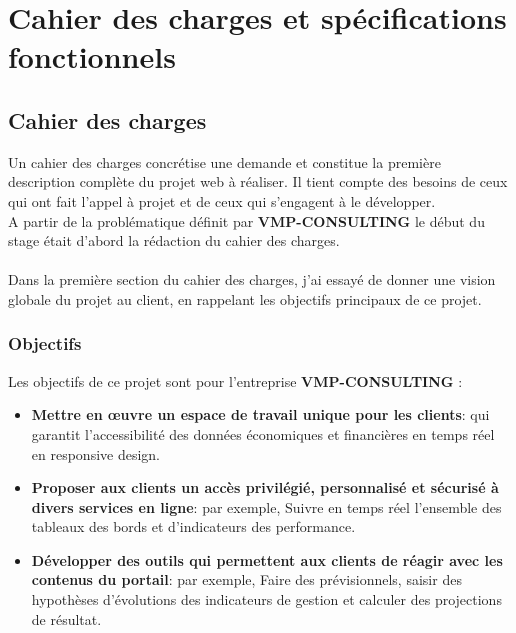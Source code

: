\documentclass[12pt]{article}
\begin{document}
\newpage

\section{ Cahier des charges et spécifications fonctionnels}

\subsection{ Cahier des charges}
Un cahier des charges concrétise une demande et constitue la première description complète du projet web à réaliser. Il tient compte des besoins de ceux qui ont fait l’appel à projet et de ceux qui s’engagent à le développer.\\


A partir de la problématique définit par \textbf{VMP-CONSULTING} le début du stage était d'abord 
la rédaction du cahier des charges.\\ \\
Dans la première section du cahier des charges, j'ai essayé de donner une vision globale du projet au client, 
en rappelant les objectifs principaux de ce projet.




\subsubsection{Objectifs}

Les objectifs de ce projet sont pour l'entreprise \textbf{VMP-CONSULTING} : 
\begin{itemize}
\item \textbf{  Mettre en œuvre un espace de travail unique pour les clients}: qui garantit 
l'accessibilité des données économiques et financières en temps réel en  responsive design.

\item \textbf{ Proposer aux clients un accès privilégié, personnalisé et sécurisé  à divers services en
ligne}:  par exemple, Suivre en temps réel l'ensemble des tableaux des bords et d'indicateurs des performance. 
 
\item \textbf{ Développer des outils qui permettent aux clients de réagir avec les contenus du
portail}: par exemple, Faire des prévisionnels, saisir des hypothèses d'évolutions des indicateurs de gestion  et calculer des projections de résultat.


\end{itemize}
\end{document}
